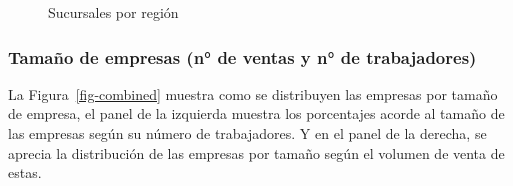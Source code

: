\documentclass[
  11pt,
]{article}
\begin{document}
\FloatBarrier

\begin{figure}[H]

\caption{\label{fig-mapa-sucursal}Sucursales por región}


\end{figure}%

\FloatBarrier

\subsubsection{Tamaño de empresas (n° de ventas y n° de
trabajadores)}\label{tamauxf1o-de-empresas-n-de-ventas-y-n-de-trabajadores}

La Figura~\ref{fig-combined} muestra como se distribuyen las empresas
por tamaño de empresa, el panel de la izquierda muestra los porcentajes
acorde al tamaño de las empresas según su número de trabajadores. Y en
el panel de la derecha, se aprecia la distribución de las empresas por
tamaño según el volumen de venta de estas.
\end{document}
